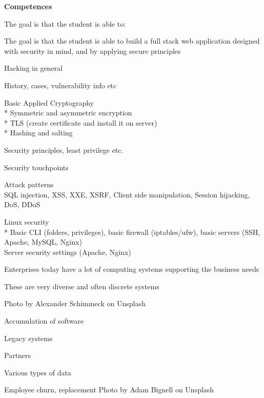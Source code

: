 \documentclass[Screen16to9,17pt]{foils}
\begin{document}
{\bf Competences}

The goal is that the student is able to:

The goal is that the student is able to build a full stack web application designed with security in mind, and by applying secure principles


\begin{list2}
\item Hacking in general
\item History, cases, vulnerability info etc
\item Basic Applied Cryptography\\
  * Symmetric and asymmetric encryption\\
  * TLS (create certificate and install it on server)\\
  * Hashing and salting
\item Security principles, least privilege etc.
\item Security touchpoints
\end{list2}

\begin{list2}
\item Attack patterns\\
SQL injection, XSS, XXE, XSRF, Client side manipulation, Session hijacking, DoS, DDoS
\item Linux security\\
* Basic CLI (folders, privileges), basic firewall (iptables/ufw), basic servers (SSH, Apache, MySQL, Nginx)\\
Server security settings (Apache, Nginx)
\end{list2}





\begin{list2}
\item Enterprises today have a lot of computing systems supporting the business needs
\item These are very diverse and often discrete systems
\end{list2}

\hfill Photo by Alexander Schimmeck on Unsplash



\begin{list2}
\item Accumulation of software
\item Legacy systems
\item Partners
\item Various types of data
\item Employee churn, replacement \hfill Photo by Adam Bignell on Unsplash
\end{list2}
\end{document}

